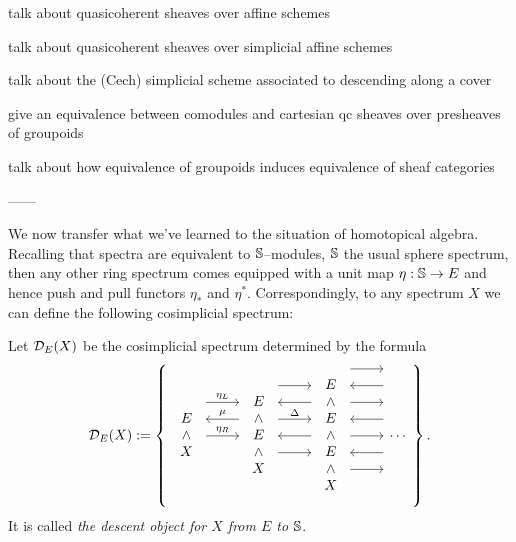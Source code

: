 talk about quasicoherent sheaves over affine schemes

talk about quasicoherent sheaves over simplicial affine schemes

talk about the (Cech) simplicial scheme associated to descending along a cover

give an equivalence between comodules and cartesian qc sheaves over presheaves of groupoids

talk about how equivalence of groupoids induces equivalence of sheaf categories

------

We now transfer what we've learned to the situation of homotopical algebra.  Recalling that spectra are equivalent to $\S$--modules, $\S$ the usual sphere spectrum, then any other ring spectrum comes equipped with a unit map $\eta: \S \to E$ and hence push and pull functors $\eta_*$ and $\eta^*$.  Correspondingly, to any spectrum $X$ we can define the following cosimplicial spectrum:
\begin{definition}
Let $\sheaf D_E(X)$ be the cosimplicial spectrum determined by the formula
\[\mathcal{D}_E(X) := \left\{
\begin{tikzcd}
\begin{array}{c} E \\ \sm \\ X \end{array} \arrow[leftarrow, shift left=\baselineskip]{r}{\mu} \arrow[shift left=(2*\baselineskip)]{r}{\eta_L} \arrow{r}{\eta_R} &
\begin{array}{c} E \\ \sm \\ E \\ \sm \\ X \end{array} \arrow[shift left=(3*\baselineskip)]{r} \arrow[leftarrow, shift left=(2*\baselineskip)]{r} \arrow[shift left=\baselineskip]{r}{\Delta} \arrow[leftarrow]{r} \arrow[shift right=\baselineskip]{r} &
\begin{array}{c} E \\ \sm \\ E \\ \sm \\ E \\ \sm \\ X \end{array} \arrow[shift left=(4*\baselineskip)]{r} \arrow[leftarrow, shift left=(3*\baselineskip)]{r} \arrow[shift left=(2*\baselineskip)]{r} \arrow[leftarrow, shift left=\baselineskip]{r} \arrow{r} \arrow[leftarrow, shift right=\baselineskip]{r} \arrow[shift right=(2*\baselineskip)]{r} &
\cdots
\end{tikzcd}
\right\}.\]
It is called \textit{the descent object for $X$ from $E$ to $\S$}.
\end{definition}

